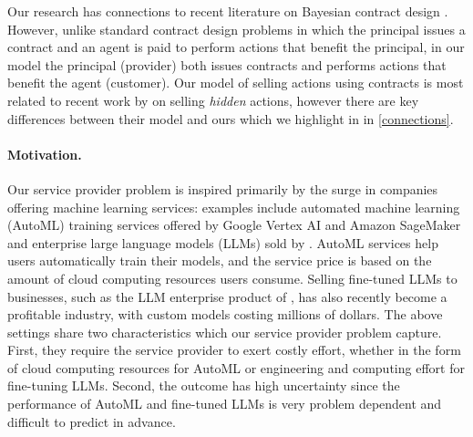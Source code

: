 Our research has connections to recent literature on Bayesian contract design \citep{alon2023bayesian,guruganesh2021contracts, castiglioni2024reduction}. However, unlike standard contract design problems in which the principal issues a contract and an agent is paid to perform actions that benefit the principal, in our model the principal (provider) both issues contracts and performs actions that benefit the agent (customer). Our model of selling actions using contracts is most related to recent work by \citet{bernasconi2024agent} on selling \emph{hidden} actions, however there are key differences between their model and ours which we highlight in in \cref{connections}.

\paragraph{Motivation.}

Our service provider problem is inspired primarily by the surge in companies 
offering machine learning services: examples include  automated machine learning (AutoML) training services offered by Google Vertex AI and Amazon SageMaker and enterprise large language models (LLMs) sold by   \citet{openai-enterprise}. AutoML services help users automatically train their models, and the service price is based on the amount of cloud computing resources users consume. Selling fine-tuned LLMs to businesses, such as the LLM enterprise product of \citet{openai-enterprise}, has also recently become a profitable industry, with custom models costing millions of dollars. The above settings share two characteristics which our service provider problem capture. First, they require the service provider to exert costly effort, whether in the form of cloud computing resources for AutoML or engineering and computing effort for fine-tuning LLMs. Second, the outcome has high uncertainty since the performance of AutoML and fine-tuned LLMs is very problem dependent and difficult to predict in advance.


